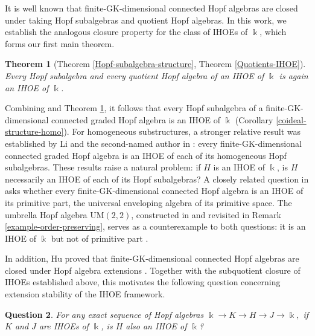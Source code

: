 \documentclass{article}
\theoremstyle{plain}
\newtheorem{thm}{Theorem}[section]
\newtheorem{question}[thm]{Question}
\theoremstyle{definition}
\numberwithin{equation}{section}
\begin{document}
	It is well known that finite-GK-dimensional connected Hopf algebras are closed under taking Hopf subalgebras and quotient Hopf algebras. In this work, we establish the analogous closure property for the class of IHOEs of $\Bbbk$, which forms our first main theorem.
	
	\begin{thm}[Theorem \ref{Hopf-subalgebra-structure}, Theorem \ref{Quotients-IHOE}]
		\label{main-Sub-Quotient}
		Every Hopf subalgebra and every quotient Hopf algebra of an IHOE of $\Bbbk$ is again an IHOE of $\Bbbk$.
	\end{thm}
	
	Combining \cite[Theorem B]{ZSL20} and Theorem \ref{main-Sub-Quotient}, it follows that every Hopf subalgebra of a finite-GK-dimensional connected graded Hopf algebra is an IHOE of $\Bbbk$ (Corollary \ref{coideal-structure-homo}). For homogeneous substructures, a stronger relative result was established by Li and the second-named author in \cite[Theorem B]{LZ23}: every finite-GK-dimensional connected graded Hopf algebra is an IHOE of each of its homogeneous Hopf subalgebras. These results raise a natural problem: if $H$ is an IHOE of $\Bbbk$, is $H$ necessarily an IHOE of each of its Hopf subalgebras? A closely related question in \cite[Question C]{LZ23} asks whether every finite-GK-dimensional connected Hopf algebra is an IHOE of its primitive part, the universal enveloping algebra of its primitive space. The umbrella Hopf algebra $\mathrm{UM}(2,2)$, constructed in \cite{HW26} and revisited in Remark \ref{example-order-preserving}, serves as a counterexample to both questions: it is an IHOE of $\Bbbk$ but not of primitive part \cite[Corollary 4.5]{HW26}.
	
	In addition, Hu proved that finite-GK-dimensional connected Hopf algebras are closed under Hopf algebra extensions \cite{Hu26}. Together with the subquotient closure of IHOEs established above, this motivates the following  question concerning extension stability of the IHOE framework.
	
	\begin{question}
		For any exact sequence of Hopf algebras $\Bbbk \rightarrow K \rightarrow H \rightarrow J \rightarrow \Bbbk,$
		if $K$ and $J$ are IHOEs of $\Bbbk$, is $H$ also an IHOE of $\Bbbk$?
	\end{question}
	
\end{document}
